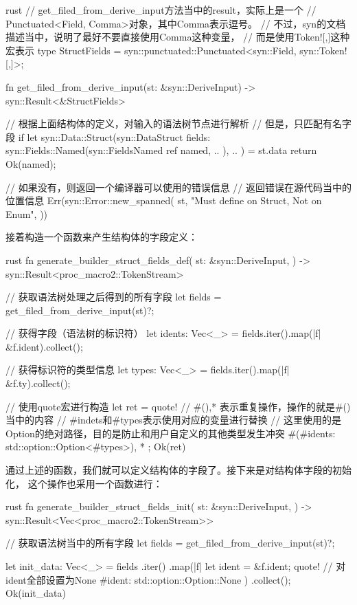 \begin{code-block}{rust}
// get_filed_from_derive_input方法当中的result，实际上是一个
// Punctuated<Field, Comma>对象，其中Comma表示逗号。
// 不过，syn的文档描述当中，说明了最好不要直接使用Comma这种变量，
// 而是使用Token![,]这种宏表示
type StructFields = syn::punctuated::Punctuated<syn::Field, syn::Token![,]>;

fn get_filed_from_derive_input(st: &syn::DeriveInput) -> syn::Result<&StructFields> {
    // 根据上面结构体的定义，对输入的语法树节点进行解析
    // 但是，只匹配有名字段
    if let syn::Data::Struct(syn::DataStruct {
        fields: syn::Fields::Named(syn::FieldsNamed { ref named, .. }),
        ..
    }) = st.data
    {
        return Ok(named);
    }

    // 如果没有，则返回一个编译器可以使用的错误信息
    // 返回错误在源代码当中的位置信息
    Err(syn::Error::new_spanned(
        st,
        "Must define on Struct, Not on Enum",
    ))
}
\end{code-block}

接着构造一个函数来产生结构体的字段定义：
\begin{code-block}{rust}
fn generate_builder_struct_fields_def(
    st: &syn::DeriveInput,
) -> syn::Result<proc_macro2::TokenStream> {
    // 获取语法树处理之后得到的所有字段
    let fields = get_filed_from_derive_input(st)?;

    // 获得字段（语法树的标识符）
    let idents: Vec<_> = fields.iter().map(|f| &f.ident).collect();

    // 获得标识符的类型信息
    let types: Vec<_> = fields.iter().map(|f| &f.ty).collect();

    // 使用quote宏进行构造
    let ret = quote! {
        // #(),* 表示重复操作，操作的就是#()当中的内容
        // #indets和#types表示使用对应的变量进行替换
        // 这里使用的是Option的绝对路径，目的是防止和用户自定义的其他类型发生冲突
        #(#idents: std::option::Option<#types>), *
    };
    Ok(ret)
}
\end{code-block}
通过上述的函数，我们就可以定义结构体的字段了。接下来是对结构体字段的初始化，
这个操作也采用一个函数进行：
\begin{code-block}{rust}
fn generate_builder_struct_fields_init(
    st: &syn::DeriveInput,
) -> syn::Result<Vec<proc_macro2::TokenStream>> {
    // 获取语法树当中的所有字段
    let fields = get_filed_from_derive_input(st)?;

    let init_data: Vec<_> = fields
        .iter()
        .map(|f| {
            let ident = &f.ident;
            quote! {
                // 对ident全部设置为None
                #ident: std::option::Option::None
            }
        })
        .collect();
    Ok(init_data)
}
\end{code-block}

